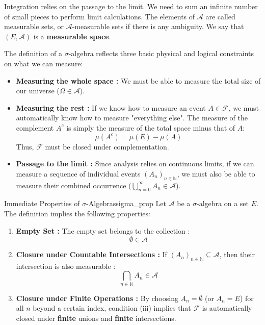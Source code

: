 Integration relies on the passage to the limit.  
We need to sum an infinite number of small pieces to perform limit calculations.
The elements of $\mathcal{A}$ are called measurable sets, or $\mathcal{A}$-measurable sets if there is any ambiguity.
We say that $(E, \mathcal{A})$ is a \textbf{measurable space}.



\begin{insight}
    The definition of a $\sigma$-algebra reflects three basic physical and logical constraints on what we can measure:
\begin{itemize}
    \item \textbf{Measuring the whole space :} We must be able to measure the total size of our universe ($\Omega \in \mathcal{A}$).
    \item \textbf{Measuring the rest :} If we know how to measure an event $A \in \mathcal{F}$, we must automatically know how to measure "everything else". The measure of the complement $A^c$ is simply the measure of the total space minus that of $A$:
    \[
        \mu(A^c) = \mu(E) - \mu(A)
    \]
    Thus, $\mathcal{F}$ must be closed under complementation.
    \item \textbf{Passage to the limit :} Since analysis relies on continuous limits, if we can measure a sequence of individual events $(A_n)_{n \in \mathbb{N}}$, we must also be able to measure their combined occurrence ($\bigcup_{n=0}^\infty A_n \in \mathcal{A}$).
\end{itemize}
\end{insight}



\begin{property}{Immediate Properties of $\sigma$-Algebras}{sigma_prop}
    Let $\mathcal{A}$ be a $\sigma$-algebra on a set $E$. The definition implies the following properties:
\begin{enumerate}
    \item \textbf{Empty Set :} The empty set belongs to the collection :
    \[
        \emptyset \in \mathcal{A}
    \]
    \item \textbf{Closure under Countable Intersections :} If $(A_n)_{n \in \mathbb{N}} \subseteq \mathcal{A}$, then their intersection is also measurable :
    \[
        \bigcap_{n \in \mathbb{N}} A_n \in \mathcal{A}
    \]
    \item \textbf{Closure under Finite Operations :} By choosing $A_n = \emptyset$ (or $A_n = E$) for all $n$ beyond a certain index, condition (iii) implies that $\mathcal{F}$ is automatically closed under \textbf{finite} unions and \textbf{finite} intersections.
\end{enumerate}
\end{property}


